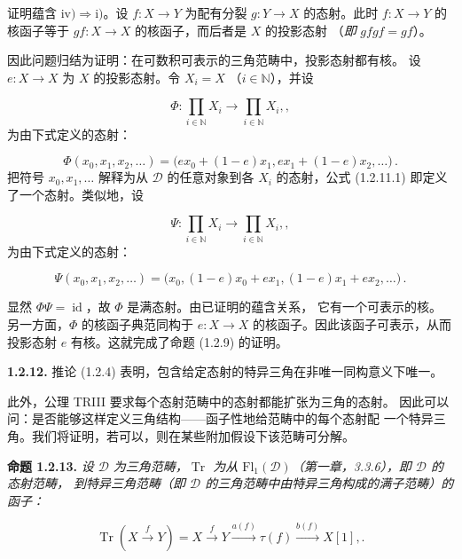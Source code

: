 \clearpage
{}%
\begingroup
\small
\setlength{\emergencystretch}{1.5em}%
\setlength{\abovedisplayskip}{4pt plus 2pt minus 2pt}%
\setlength{\belowdisplayskip}{4pt plus 2pt minus 2pt}%

证明蕴含 $\mathrm{iv)}\Longrightarrow\mathrm{i)}$。设
$f\colon X\longrightarrow Y$ 为配有分裂 $g\colon Y\longrightarrow X$
的态射。此时 $f\colon X\longrightarrow Y$ 的核函子等于
$gf\colon X\longrightarrow X$ 的核函子，而后者是 $X$ 的投影态射
（{\itshape 即} $gfgf=gf$）。

因此问题归结为证明：在可数积可表示的三角范畴中，投影态射都有核。
设 $e\colon X\longrightarrow X$ 为 $X$ 的投影态射。令 $X_i=X$
（$i\in\mathbb N$），并设

\[
  \Phi\colon\prod_{i\in\mathbb N}X_i\longrightarrow
  \prod_{i\in\mathbb N}X_i, ,
\]
为由下式定义的态射：

\begin{equation}
  \Phi(x_0,x_1,x_2,\ldots)
  =\bigl(ex_0+(1-e)x_1,ex_1+(1-e)x_2,\ldots\bigr)\,.
  \tag{1.2.11.1}
\end{equation}
把符号 $x_0,x_1,\ldots$ 解释为从 $\mathcal D$ 的任意对象到各 $X_i$
的态射，公式 (1.2.11.1) 即定义了一个态射。类似地，设

\[
  \Psi\colon\prod_{i\in\mathbb N}X_i\longrightarrow
  \prod_{i\in\mathbb N}X_i, ,
\]
为由下式定义的态射：

\begin{equation}
  \Psi(x_0,x_1,x_2,\ldots)
  =\bigl(x_0,(1-e)x_0+ex_1,(1-e)x_1+ex_2,\ldots\bigr)\,.
  \tag{1.2.11.2}
\end{equation}

显然 $\Phi\Psi=\operatorname{id}$，故 $\Phi$ 是满态射。由已证明的蕴含关系，
它有一个可表示的核。另一方面，$\Phi$ 的核函子典范同构于
$e\colon X\longrightarrow X$ 的核函子。因此该函子可表示，从而投影态射
$e$ 有核。这就完成了命题 (1.2.9) 的证明。

\medskip
\noindent\textbf{1.2.12.}\quad
推论 (1.2.4) 表明，包含给定态射的特异三角在非唯一同构意义下唯一。

此外，公理 TRIII 要求每个态射范畴中的态射都能扩张为三角的态射。
因此可以问：是否能够这样定义三角结构——函子性地给范畴中的每个态射配
一个特异三角。我们将证明，若可以，则在某些附加假设下该范畴可分解。

\medskip
\noindent\textbf{命题 1.2.13.}\quad
\textit{设 $\mathcal D$ 为三角范畴，$\operatorname{Tr}$ 为从
$\mathrm{Fl}_1(\mathcal D)$（第一章，3.3.6），即 $\mathcal D$ 的态射范畴，
到特异三角范畴（即 $\mathcal D$ 的三角范畴中由特异三角构成的满子范畴）的函子：}

\[
  \operatorname{Tr}\!\left(X\xrightarrow{f}Y\right)
  =X\xrightarrow{f}Y\xrightarrow{a(f)}\tau(f)
  \xrightarrow{b(f)}X[1], .
\]
\endgroup
